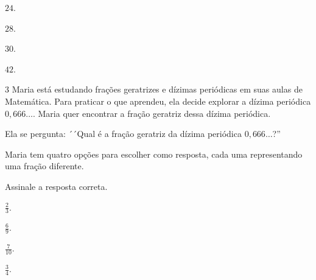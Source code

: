 \begin{escolha}
\item $24$.
\item $28$.
\item $30$.
\item $42$.
\end{escolha}



\num{3} Maria está estudando frações geratrizes e dízimas periódicas em suas
aulas de Matemática. Para praticar o que aprendeu, ela decide explorar a
dízima periódica $0,666\ldots$. Maria quer encontrar a fração geratriz dessa
dízima periódica.

Ela se pergunta: ´´Qual é a fração geratriz da dízima periódica $0,666\ldots$?''

Maria tem quatro opções para escolher como resposta, cada uma representando uma fração diferente.

Assinale a resposta correta.

\begin{escolha}
\item $\frac{2}{3}$.
\item $\frac{6}{9}$.
\item $\frac{7}{10}$.
\item $\frac{3}{4}$.
\end{escolha}


